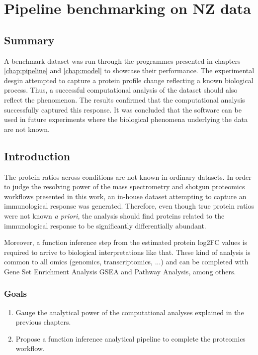 \chapter{Pipeline benchmarking on \ac{NZ} data}
\label{chap:benchmark}

\section*{Summary}

A benchmark dataset was run through the programmes presented in chapters \ref{chap:pipeline} and \ref{chap:model} to showcase their performance. The experimental desgin attempted to capture a protein profile change reflecting a known biological process. Thus, a successful computational analysis of the dataset should also reflect the phenomenon. The results confirmed that the computational analysis successfully captured this response. It was concluded that the software can be used in future experiments where the biological phenomena underlying the data are not known.

\section{Introduction}

The protein ratios across conditions are not known in ordinary datasets. In order to judge the resolving power of the mass spectrometry and shotgun proteomics workflows presented in this work, an in-house dataset attempting to capture an immunological response was generated. Therefore, even though true protein ratios were not known \textit{a priori}, the analysis should find proteins related to the immunological response to be significantly differentially abundant. 

Moreover, a function inference step from the estimated protein \ac{log2FC} values is required to arrive to biological interpretations like that. These kind of analysis is common to all omics (genomics, transcriptomics, ...) and can be completed with Gene Set Enrichment Analysis \ac{GSEA} and Pathway Analysis, among others.

\subsection{Goals}

\begin{enumerate}

\item Gauge the analytical power of the computational analyses explained in the previous chapters.


\item Propose a function inference analytical pipeline to complete the proteomics workflow.

\end{enumerate}


